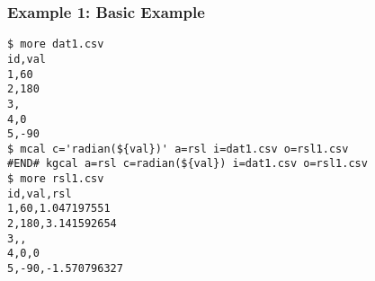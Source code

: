 \subsubsection*{Example 1: Basic Example}



\begin{Verbatim}[baselinestretch=0.7,frame=single]
$ more dat1.csv
id,val
1,60
2,180
3,
4,0
5,-90
$ mcal c='radian(${val})' a=rsl i=dat1.csv o=rsl1.csv
#END# kgcal a=rsl c=radian(${val}) i=dat1.csv o=rsl1.csv
$ more rsl1.csv
id,val,rsl
1,60,1.047197551
2,180,3.141592654
3,,
4,0,0
5,-90,-1.570796327
\end{Verbatim}
